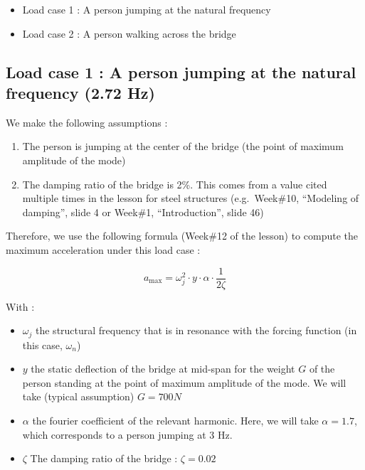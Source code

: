 \documentclass[11pt]{article}
\providecommand{\tightlist}{%
      \setlength{\itemsep}{0pt}\setlength{\parskip}{0pt}}
\begin{document}
\begin{itemize}
\tightlist
\item
  Load case 1 : A person jumping at the natural frequency
\item
  Load case 2 : A person walking across the bridge
\end{itemize}

    \hypertarget{load-case-1-a-person-jumping-at-the-natural-frequency-2.72-hz}{%
\subsection{Load case 1 : A person jumping at the natural frequency
(2.72
Hz)}\label{load-case-1-a-person-jumping-at-the-natural-frequency-2.72-hz}}

    We make the following assumptions :

\begin{enumerate}
\def\labelenumi{\arabic{enumi}.}
\tightlist
\item
  The person is jumping at the center of the bridge (the point of
  maximum amplitude of the mode)
\item
  The damping ratio of the bridge is 2\%. This comes from a value cited
  multiple times in the lesson for steel structures (e.g.~Week\#10,
  ``Modeling of damping'', slide 4 or Week\#1, ``Introduction'', slide
  46)
\end{enumerate}

    Therefore, we use the following formula (Week\#12 of the lesson) to
compute the maximum acceleration under this load case :

\[
a_{\max }=\omega_j^2 \cdot y \cdot \alpha \cdot \frac{1}{2 \zeta}
\]

With :

\begin{itemize}
\tightlist
\item
  \(\omega_j\) the structural frequency that is in resonance with the
  forcing function (in this case, \(\omega_n\))
\item
  \(y\) the static deflection of the bridge at mid-span for the weight
  \(G\) of the person standing at the point of maximum amplitude of the
  mode. We will take (typical assumption) \(G = 700 N\)
\item
  \(\alpha\) the fourier coefficient of the relevant harmonic. Here, we
  will take \(\alpha = 1.7\), which corresponds to a person jumping at 3
  Hz.
\item
  \(\zeta\) The damping ratio of the bridge : \(\zeta = 0.02\)
\end{itemize}
\end{document}
